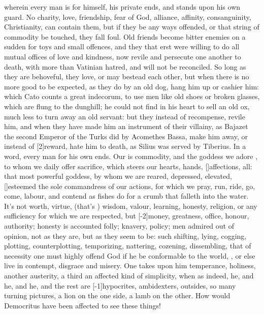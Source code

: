 {wherein every man is for himself, his private ends, and stands upon his
own guard. No charity, love, friendship, fear of God, alliance,
affinity, consanguinity, Christianity, can contain them, but if they be
any ways offended, or that string of commodity be touched, they fall
foul. Old friends become bitter enemies on a sudden for toys and small
offences, and they that erst were willing to do all mutual offices of
love and kindness, now revile and persecute one another to death, with
more than Vatinian hatred, and will not be reconciled. So long as they
are behoveful, they love, or may bestead each other, but when there is
no more good to be expected, as they do by an old dog, hang him up or
cashier him: which  Cato counts a great indecorum, to use men like
old shoes or broken glasses, which are flung to the dunghill; he could
not find in his heart to sell an old ox, much less to turn away an old
servant: but they instead of recompense, revile him, and when they have
made him an instrument of their villainy, as Bajazet the second
Emperor of the Turks did by Acomethes Bassa, make him away, or instead
of [2\baselineskip]reward, hate him to death, as Silius was served by Tiberius. In
a word, every man for his own ends. Our  is commodity, and
the goddess we adore , to whom we daily offer
sacrifice, which steers our hearts, hands, [\baselineskip]affections, all: that
most powerful goddess, by whom we are reared, depressed, elevated,
[\baselineskip]esteemed the sole commandress of our actions, for which we pray,
run, ride, go, come, labour, and contend as fishes do for a crumb that
falleth into the water. It's not worth, virtue, (that's ) wisdom, valour, learning, honesty, religion, or any
sufficiency for which we are respected, but [-2\baselineskip]money, greatness,
office, honour, authority; honesty is accounted folly; knavery, policy;
men admired out of opinion, not as they are, but as they seem to
be: such shifting, lying, cogging, plotting, counterplotting,
temporizing, nattering, cozening, dissembling, that of necessity
one must highly offend God if he be conformable to the world, , or else live in contempt, disgrace and misery. One takes
upon him temperance, holiness, another austerity, a third an affected
kind of simplicity, when as indeed, he, and he, and he, and the rest
are [-1\baselineskip]hypocrites, ambidexters, outsides, so many turning pictures, a
lion on the one side, a lamb on the other. How would Democritus
have been affected to see these things!

}
